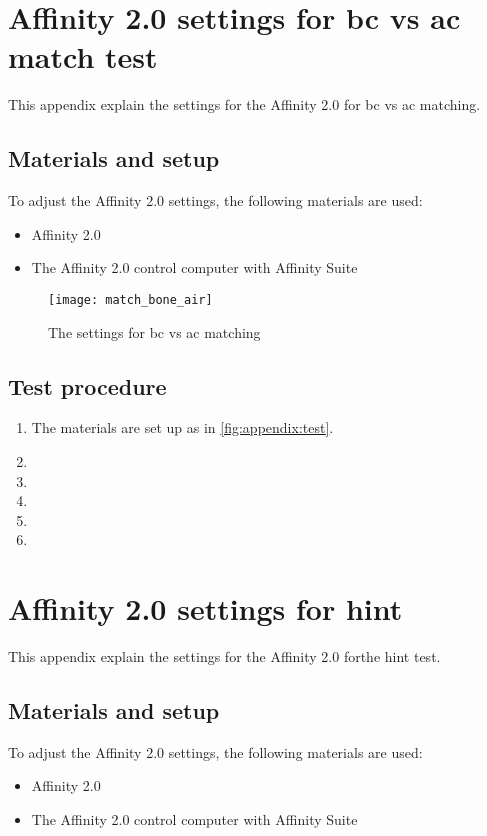 \chapter*{Affinity 2.0 settings for \gls{bc} vs \gls{ac} match test}
\label{apend:aff_bc_ac_match}
This appendix explain the settings for the Affinity 2.0 for \gls{bc} vs \gls{ac} matching.

\section*{Materials and setup}
To adjust the Affinity 2.0 settings, the following materials are used:
\begin{itemize}
\item Affinity 2.0
\item The Affinity 2.0 control computer with Affinity Suite
\end{itemize}

\begin{figure}[H]
	\centering
		\texttt{[image: match\_bone\_air]}
		\caption{The settings for  \gls{bc} vs \gls{ac} matching}
		\label{fig:apend_match_bone_air}
\end{figure}

\section*{Test procedure}


\begin{enumerate}
\item The materials are set up as in \autoref{fig:appendix:test}.
\item 
\item  
\item  
\item 
\item 
\end{enumerate}

\chapter*{Affinity 2.0 settings for \gls{hint}}
This appendix explain the settings for the Affinity 2.0 forthe \gls{hint} test.

\section*{Materials and setup}
To adjust the Affinity 2.0 settings, the following materials are used:
\begin{itemize}
\item Affinity 2.0
\item The Affinity 2.0 control computer with Affinity Suite
\end{itemize}

